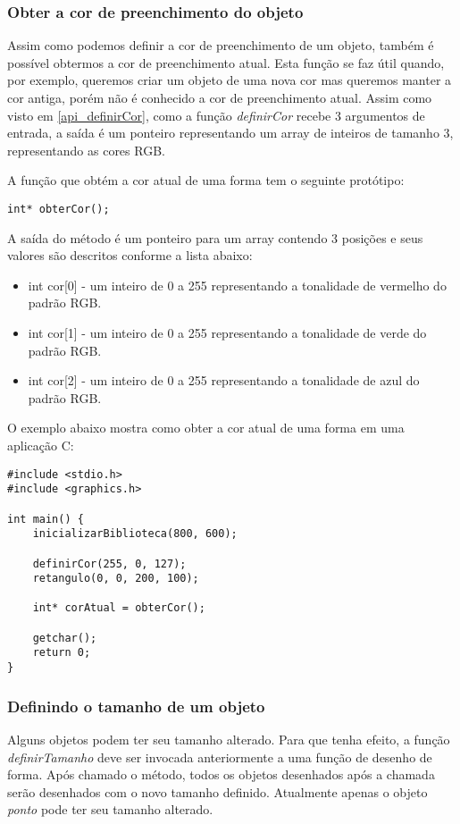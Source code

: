 \documentclass[12pt, %
openright,
oneside, %
a4paper,    %
brazil]{facom-ufu-abntex2}
\begin{document}
\subsubsection{Obter a cor de preenchimento do objeto}
Assim como podemos definir a cor de preenchimento de um objeto, também é possível obtermos a cor de preenchimento atual. Esta função se faz útil quando, por exemplo, queremos criar um objeto de uma nova cor mas queremos manter a cor antiga, porém não é conhecido a cor de preenchimento atual. Assim como visto em \ref{api_definirCor}, como a função \textit{definirCor} recebe 3 argumentos de entrada, a saída é um ponteiro representando um array de inteiros de tamanho 3, representando as cores RGB.

A função que obtém a cor atual de uma forma tem o seguinte protótipo:

\begin{verbatim}
int* obterCor();
\end{verbatim}

A saída do método é um ponteiro para um array contendo 3 posições e seus valores são descritos conforme a lista abaixo:

\begin{itemize}
    \item int cor[0] - um inteiro de 0 a 255 representando a tonalidade de vermelho do padrão RGB.
    \item int cor[1] - um inteiro de 0 a 255 representando a tonalidade de verde do padrão RGB.
    \item int cor[2] - um inteiro de 0 a 255 representando a tonalidade de azul do padrão RGB.
\end{itemize}

O exemplo abaixo mostra como obter a cor atual de uma forma em uma aplicação C:

\begin{verbatim}
#include <stdio.h>
#include <graphics.h>

int main() {
    inicializarBiblioteca(800, 600);

    definirCor(255, 0, 127);
    retangulo(0, 0, 200, 100);

    int* corAtual = obterCor();

    getchar();
    return 0;
}
\end{verbatim}

\subsubsection{Definindo o tamanho de um objeto}
Alguns objetos podem ter seu tamanho alterado. Para que tenha efeito, a função \textit{definirTamanho} deve ser invocada anteriormente a uma função de desenho de forma. Após chamado o método, todos os objetos desenhados após a chamada serão desenhados com o novo tamanho definido. Atualmente apenas o objeto \textit{ponto} pode ter seu tamanho alterado.
\end{document}
